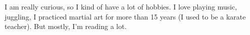 

\begin{cvparagraph}

I am really curious, so I kind of have a lot of hobbies.
I love playing music, juggling, I practiced martial art for more than 15 years (I used to be a karate teacher).
But mostly, I'm reading a lot.

\end{cvparagraph}
